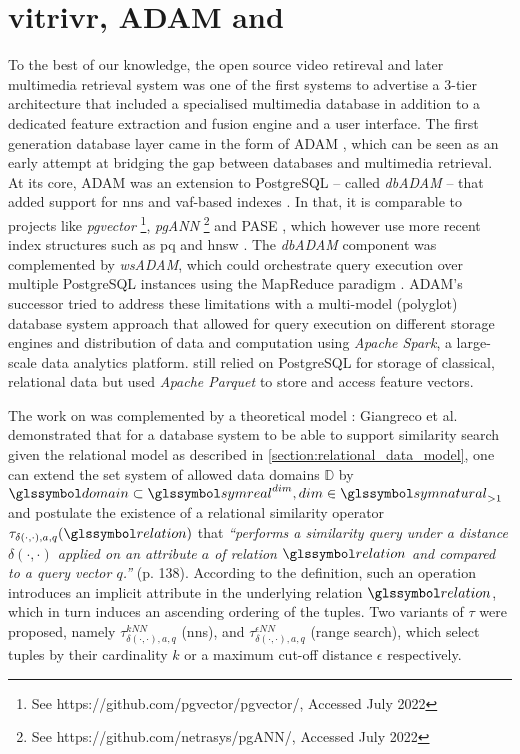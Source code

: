 \section{vitrivr, ADAM and \texorpdfstring{\adampro{}}{ADAMpro}}

To the best of our knowledge, the open source \vitrivr{} video retireval \cite{Rossetto:2016Vitrivr} and later multimedia retrieval \cite{Gasser:2019Multimodal} system was one of the first systems to advertise a 3-tier architecture that included a specialised multimedia database in addition to a dedicated feature extraction and fusion engine and a user interface. The first generation database layer came in the form of ADAM \cite{Giangreco:2014Adam}, which can be seen as an early attempt at bridging the gap between databases and multimedia retrieval. At its core, ADAM was an extension to PostgreSQL -- called \emph{dbADAM} -- that added support for \acrshort{nns} and \acrshort{vaf}-based indexes \cite{Weber:1998Va}. In that, it is comparable to projects like \emph{pgvector} \footnote{See https://github.com/pgvector/pgvector/, Accessed July 2022}, \emph{pgANN} \footnote{See https://github.com/netrasys/pgANN/, Accessed July 2022} and PASE \cite{Yang:2020Pase}, which however use more recent index structures such as \acrshort{pq} \cite{Jegou:2010Product} and \acrshort{hnsw} \cite{Malkov:2018Efficient}. The \emph{dbADAM} component was complemented by \emph{wsADAM}, which could orchestrate query execution over multiple PostgreSQL instances using the MapReduce paradigm \cite{Dean:2008Mapreduce}. ADAM's successor \adampro{} \cite{Giangreco:2016Adam} tried to address these limitations with a multi-model (polyglot) database system approach that allowed for query execution on different storage engines and distribution of data and computation using \emph{Apache Spark}, a large-scale data analytics platform. \adampro{} still relied on PostgreSQL for storage of classical, relational data but used \emph{Apache Parquet} to store and access feature vectors. 

The work on \adampro{} was complemented by a theoretical model \cite{Giangreco:2018Database}: Giangreco et al. demonstrated that for a database system to be able to support similarity search given the relational model as described in \cref{section:relational_data_model}, one can extend the set system of allowed data domains $\mathbb{D}$ by $\domain \subset \symreal^{dim}, dim \in \symnatural_{>1}$ and postulate the existence of a relational similarity operator $\tau_{\delta(\cdot,\cdot),a,q}(\relation)$ that \emph{``performs a similarity query under a distance $\delta(\cdot,\cdot)$ applied on an attribute $a$ of relation $\relation$ and compared to a query vector $q$.''} \cite{Giangreco:2018Database} (p. 138). According to the definition, such an operation introduces an implicit attribute in the underlying relation $\relation$, which in turn induces an ascending ordering of the tuples. Two variants of $\tau$ were proposed, namely $\tau^{kNN}_{\delta(\cdot,\cdot),a,q}$ (\acrshort{nns}), and $\tau^{\epsilon NN}_{\delta(\cdot,\cdot),a,q}$ (range search), which select tuples by their cardinality $k$ or a maximum cut-off distance $\epsilon$ respectively.

